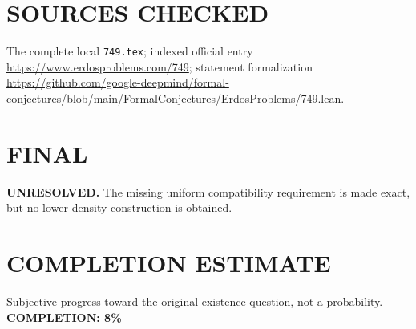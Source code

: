 \section{SOURCES CHECKED}
The complete local \texttt{749.tex}; indexed official entry \url{https://www.erdosproblems.com/749}; statement formalization \url{https://github.com/google-deepmind/formal-conjectures/blob/main/FormalConjectures/ErdosProblems/749.lean}.
\section{FINAL}
\textbf{UNRESOLVED.} The missing uniform compatibility requirement is made exact, but no lower-density construction is obtained.
\section{COMPLETION ESTIMATE}
Subjective progress toward the original existence question, not a probability.
\textbf{COMPLETION: 8\%}
